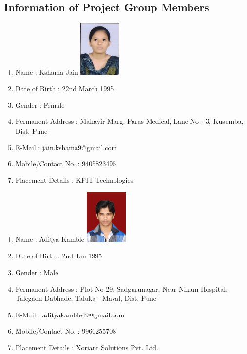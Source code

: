 \documentclass[oneside,a4paper,12pt]{report}
\begin{document}
{\begin{appendices}
\chapter{Information of Project Group Members}


\begin{enumerate}
	\item Name : Kshama Jain  \hspace{90 mm}
	\includegraphics[width=60pt]{kshama-jain.jpg}
	\item Date of Birth : 22nd March 1995
	\item Gender : Female
	\item Permanent Address : Mahavir Marg, Paras Medical, Lane No - 3, Kusumba, Dist. Pune  
	\item E-Mail : jain.kshama9@gmail.com
	\item Mobile/Contact No. : 9405823495
	\item Placement Details : KPIT Technologies
\end{enumerate}
\pagebreak

\begin{enumerate}
	\item Name : Aditya Kamble  \hspace{90 mm}
	\includegraphics[width=60pt]{aditya-kamble.jpg}
	\item Date of Birth : 2nd Jan 1995
	\item Gender : Male
	\item Permanent Address : Plot No 29, Sadgurunagar, Near Nikam Hospital, Talegaon Dabhade, Taluka - Maval, Dist. Pune
	\item E-Mail : adityakamble49@gmail.com
	\item Mobile/Contact No. : 9960255708
	\item Placement Details : Xoriant Solutions Pvt. Ltd.
\end{enumerate}
\pagebreak


\end{appendices}}
\end{document}
